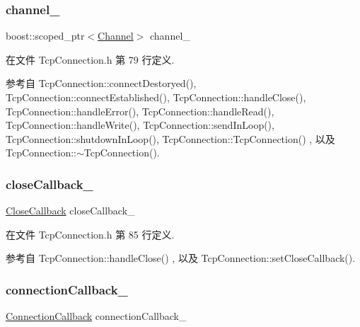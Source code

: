 \subsubsection{\texorpdfstring{channel\+\_\+}{channel\_}}
{\footnotesize\ttfamily boost\+::scoped\+\_\+ptr$<$\hyperlink{classmuduo_1_1Channel}{Channel}$>$ channel\+\_\+\hspace{0.3cm}{\ttfamily [private]}}



在文件 Tcp\+Connection.\+h 第 79 行定义.



参考自 Tcp\+Connection\+::connect\+Destoryed(), Tcp\+Connection\+::connect\+Established(), Tcp\+Connection\+::handle\+Close(), Tcp\+Connection\+::handle\+Error(), Tcp\+Connection\+::handle\+Read(), Tcp\+Connection\+::handle\+Write(), Tcp\+Connection\+::send\+In\+Loop(), Tcp\+Connection\+::shutdown\+In\+Loop(), Tcp\+Connection\+::\+Tcp\+Connection() , 以及 Tcp\+Connection\+::$\sim$\+Tcp\+Connection().

\mbox{\label{classmuduo_1_1TcpConnection_af4ea87dce1e6aaa022507ff52bc7360b}} 
\subsubsection{\texorpdfstring{close\+Callback\+\_\+}{closeCallback\_}}
{\footnotesize\ttfamily \hyperlink{namespacemuduo_ab2469aa3fe08794ee43a3d8f69bff30f}{Close\+Callback} close\+Callback\+\_\+\hspace{0.3cm}{\ttfamily [private]}}



在文件 Tcp\+Connection.\+h 第 85 行定义.



参考自 Tcp\+Connection\+::handle\+Close() , 以及 Tcp\+Connection\+::set\+Close\+Callback().

\mbox{\label{classmuduo_1_1TcpConnection_ae4ac7fea1abbcfb56d481dbe8ffb37e7}} 
\subsubsection{\texorpdfstring{connection\+Callback\+\_\+}{connectionCallback\_}}
{\footnotesize\ttfamily \hyperlink{namespacemuduo_ac7f7b0c9c9e96123dfea3fe120a2c404}{Connection\+Callback} connection\+Callback\+\_\+\hspace{0.3cm}{\ttfamily [private]}}



